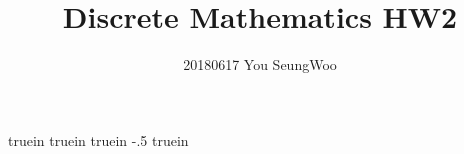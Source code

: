  truein 
 truein 
 truein 
\topmargin -.5 truein 
\textheight 8.5in
\setlength{\parindent}{10pt}
\hypersetup{
	colorlinks=true,
	linkcolor=red,
	filecolor=magenta,      
	urlcolor=cyan,
}


\title{Discrete Mathematics HW2}
\author{20180617 You SeungWoo}